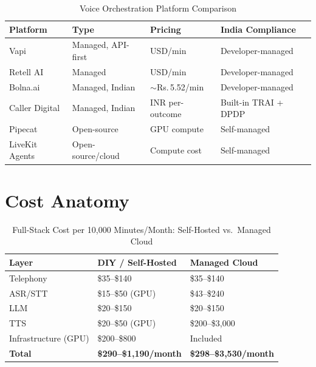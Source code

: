 \documentclass[12pt,a4paper]{article}
\begin{document}
\begin{table}[H]\centering
\caption{Voice Orchestration Platform Comparison}
\label{tab:orchestration}
\small
\begin{tabularx}{\textwidth}{L{2.4cm}L{2.4cm}L{2.0cm}X}
\toprule
\textbf{Platform} & \textbf{Type} & \textbf{Pricing} & \textbf{India Compliance} \\
\midrule
Vapi          & Managed, API-first   & USD/min              & Developer-managed \\
Retell AI     & Managed              & USD/min              & Developer-managed \\
Bolna.ai      & Managed, Indian      & $\sim$Rs.\,5.52/min  & Developer-managed \\
Caller Digital& Managed, Indian      & INR per-outcome      & Built-in TRAI + DPDP \\
Pipecat       & Open-source          & GPU compute          & Self-managed \\
LiveKit Agents& Open-source/cloud    & Compute cost         & Self-managed \\
\bottomrule
\end{tabularx}
\end{table}

\section{Cost Anatomy}
\label{sec:cost}

\begin{table}[H]\centering
\caption{Full-Stack Cost per 10{,}000 Minutes/Month: Self-Hosted vs.\ Managed Cloud}
\label{tab:cost-breakdown}
\begin{tabularx}{\textwidth}{lXX}
\toprule
\textbf{Layer} & \textbf{DIY / Self-Hosted} & \textbf{Managed Cloud} \\
\midrule
Telephony            & \$35--\$140              & \$35--\$140 \\
ASR/STT              & \$15--\$50 (GPU)         & \$43--\$240 \\
LLM                  & \$20--\$150              & \$20--\$150 \\
TTS                  & \$20--\$50 (GPU)         & \$200--\$3{,}000 \\
Infrastructure (GPU) & \$200--\$800             & Included \\
\midrule
\textbf{Total}       & \textbf{\$290--\$1{,}190/month} & \textbf{\$298--\$3{,}530/month} \\
\bottomrule
\end{tabularx}
\end{table}
\end{document}
